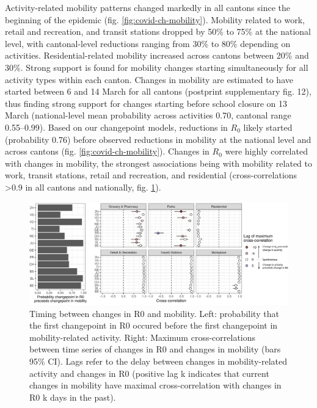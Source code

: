 Activity-related mobility patterns changed markedly in all cantons since the beginning of the epidemic (fig. \ref{fig:covid-ch-mobility}). Mobility related to work, retail and recreation, and transit stations dropped by 50\% to 75\% at the national level, with cantonal-level reductions ranging from 30\% to 80\% depending on activities. Residential-related mobility increased across cantons between 20\% and 30\%. Strong support is found for mobility changes starting simultaneously for all activity types within each canton. Changes in mobility are estimated to have started between 6 and 14 March for all cantons (postprint supplementary fig. 12), thus finding strong support for changes starting before school closure on 13 March (national-level mean probability across activities 0.70, cantonal range 0.55–0.99). Based on our changepoint models, reductions in $R_0$ likely started (probability 0.76) before observed reductions in mobility at the national level and across cantons (fig. \ref{fig:covid-ch-mobility}). Changes in $R_0$ were highly correlated with changes in mobility, the strongest associations being with mobility related to work, transit stations, retail and recreation, and residential (cross-correlations >0.9 in all cantons and nationally, fig. \ref{fig:covid-ch-timing}). 
\begin{figure}\centering
  \includegraphics[width=\textwidth]{fig_covid-switzerland-npi/FIGURE_4.png}
  \caption[Timing between changes in R0 and mobility.]{Timing between changes in R0 and mobility. Left: probability that the first changepoint in R0 occured before the first changepoint in mobility-related activity. Right: Maximum cross-correlations between time series of changes in R0 and changes in mobility (bars 95\% CI). Lags refer to the delay between changes in mobility-related activity and changes in R0 (positive lag k indicates that current changes in mobility have maximal cross-correlation with changes in R0 k days in the past).}
  \label{fig:covid-ch-timing}
\end{figure}

